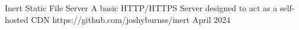 

\begin{cventries}

  \cventry
    {Inert Static File Server} %
    {A basic HTTP/HTTPS Server designed to act as a self-hosted CDN} %
    {https://github.com/joshyburnss/inert} %
    {April 2024} %
    {
      \begin{cvitems} %
        \item {}
      \end{cvitems}
    }

\end{cventries}

